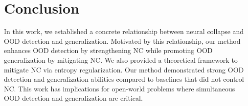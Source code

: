 \section{Conclusion}
\label{sec:conclusion}

In this work, we established a concrete relationship between neural collapse and OOD detection and generalization. Motivated by this relationship, our method enhances OOD detection by strengthening NC while promoting OOD generalization by mitigating NC. We also provided a theoretical framework to mitigate NC via entropy regularization.
Our method demonstrated strong OOD detection and generalization abilities compared to baselines that did not control NC.
This work has implications for open-world problems where simultaneous OOD detection and generalization are critical.

